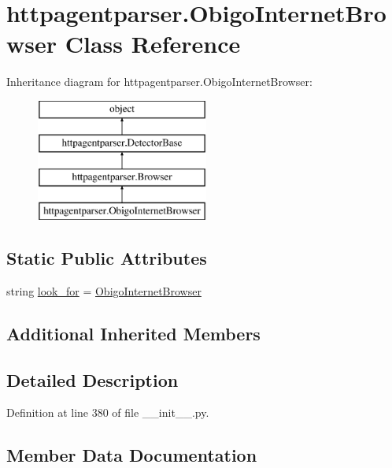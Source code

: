 \hypertarget{classhttpagentparser_1_1_obigo_internet_browser}{}\section{httpagentparser.\+Obigo\+Internet\+Browser Class Reference}
\label{classhttpagentparser_1_1_obigo_internet_browser}
Inheritance diagram for httpagentparser.\+Obigo\+Internet\+Browser\+:\begin{figure}[H]
\begin{center}
\leavevmode
\includegraphics[height=4.000000cm]{classhttpagentparser_1_1_obigo_internet_browser}
\end{center}
\end{figure}
\subsection*{Static Public Attributes}
\begin{DoxyCompactItemize}
\item 
string \hyperlink{classhttpagentparser_1_1_obigo_internet_browser_ae5c60ed835bb57569b12a20b366b1aa4}{look\+\_\+for} = \textquotesingle{}\hyperlink{classhttpagentparser_1_1_obigo_internet_browser}{Obigo\+Internet\+Browser}\textquotesingle{}
\end{DoxyCompactItemize}
\subsection*{Additional Inherited Members}


\subsection{Detailed Description}


Definition at line 380 of file \+\_\+\+\_\+init\+\_\+\+\_\+.\+py.



\subsection{Member Data Documentation}
\hypertarget{classhttpagentparser_1_1_obigo_internet_browser_ae5c60ed835bb57569b12a20b366b1aa4}{}\label{classhttpagentparser_1_1_obigo_internet_browser_ae5c60ed835bb57569b12a20b366b1aa4} 
